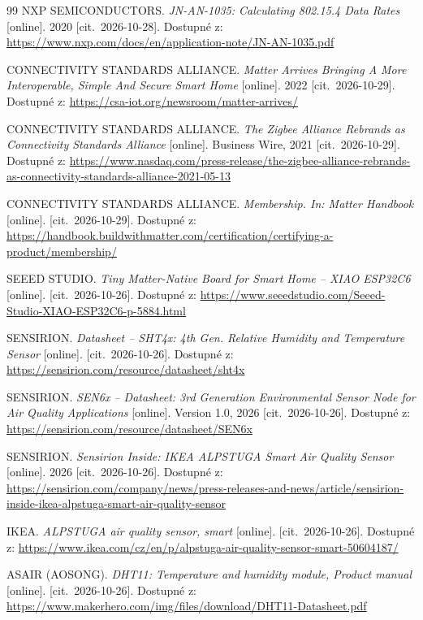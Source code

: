 \begin{thebibliography}{99}
NXP SEMICONDUCTORS. \emph{JN-AN-1035: Calculating 802.15.4 Data Rates}
[online]. 2020 [cit.~2026-10-28].
Dostupné z: \url{https://www.nxp.com/docs/en/application-note/JN-AN-1035.pdf}

CONNECTIVITY STANDARDS ALLIANCE. \emph{Matter Arrives Bringing A More Interoperable, Simple And Secure Smart Home}
[online]. 2022 [cit.~2026-10-29].
Dostupné z: \url{https://csa-iot.org/newsroom/matter-arrives/}

CONNECTIVITY STANDARDS ALLIANCE. \emph{The Zigbee Alliance Rebrands as Connectivity Standards Alliance}
[online]. Business Wire, 2021 [cit.~2026-10-29].
Dostupné z: \url{https://www.nasdaq.com/press-release/the-zigbee-alliance-rebrands-as-connectivity-standards-alliance-2021-05-13}

CONNECTIVITY STANDARDS ALLIANCE. \emph{Membership. In: Matter Handbook}
[online]. [cit.~2026-10-29].
Dostupné z: \url{https://handbook.buildwithmatter.com/certification/certifying-a-product/membership/}

SEEED STUDIO. \emph{Tiny Matter-Native Board for Smart Home -- XIAO ESP32C6}
[online]. [cit.~2026-10-26].
Dostupné z: \url{https://www.seeedstudio.com/Seeed-Studio-XIAO-ESP32C6-p-5884.html}

SENSIRION. \emph{Datasheet -- SHT4x: 4th Gen. Relative Humidity and Temperature Sensor}
[online]. [cit.~2026-10-26].
Dostupné z: \url{https://sensirion.com/resource/datasheet/sht4x}

SENSIRION. \emph{SEN6x -- Datasheet: 3rd Generation Environmental Sensor Node for Air Quality Applications}
[online]. Version 1.0, 2026 [cit.~2026-10-26].
Dostupné z: \url{https://sensirion.com/resource/datasheet/SEN6x}

SENSIRION. \emph{Sensirion Inside: IKEA ALPSTUGA Smart Air Quality Sensor}
[online]. 2026 [cit.~2026-10-26].
Dostupné z: \url{https://sensirion.com/company/news/press-releases-and-news/article/sensirion-inside-ikea-alpstuga-smart-air-quality-sensor}

IKEA. \emph{ALPSTUGA air quality sensor, smart}
[online]. [cit.~2026-10-26].
Dostupné z: \url{https://www.ikea.com/cz/en/p/alpstuga-air-quality-sensor-smart-50604187/}

ASAIR (AOSONG). \emph{DHT11: Temperature and humidity module, Product manual}
[online]. [cit.~2026-10-26].
Dostupné z: \url{https://www.makerhero.com/img/files/download/DHT11-Datasheet.pdf}


\end{thebibliography}
